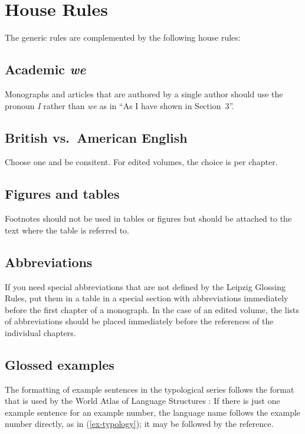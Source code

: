 \section{House Rules}\label{sec:houserules}
The generic rules are complemented by the following house rules:

\subsection{Academic \emph{we}}

Monographs and articles that are authored by a single author should use the pronoun \emph{I} rather
than \emph{we} as in ``As I have shown in Section~3''.	
 

\subsection{British vs.\ American English}
Choose one and be consitent. For edited volumes, the choice is per chapter.  


\subsection{Figures and tables} 
Footnotes should not be used in tables or figures but should be attached to the text where the table is referred to.



\subsection{Abbreviations}
If you need special abbreviations that are not defined by the Leipzig Glossing Rules, put them in a table in a special section with abbreviations immediately before the first chapter of a monograph. In the case of an edited volume, the lists of abbreviations should be placed immediately before the references of the individual chapters.

\subsection{Glossed examples}
The formatting of example sentences in the typological series follows the format that is used by the World Atlas of Language Structures \citep{WALS}: If there is just one example sentence for an example number, the language name follows the example number directly, as in (\ref{ex-typology}); it may be followed by the reference.

